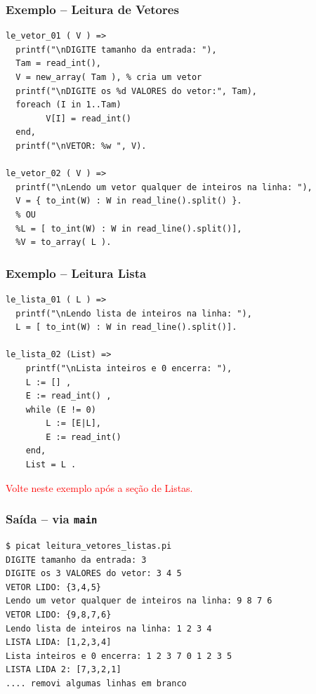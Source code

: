\begin{frame}[fragile]
\frametitle{Exemplo -- Leitura de Vetores}    

\begin{footnotesize}
\begin{verbatim}
le_vetor_01 ( V ) =>
  printf("\nDIGITE tamanho da entrada: "),
  Tam = read_int(),
  V = new_array( Tam ), % cria um vetor
  printf("\nDIGITE os %d VALORES do vetor:", Tam),
  foreach (I in 1..Tam)
        V[I] = read_int()
  end,
  printf("\nVETOR: %w ", V).
  
le_vetor_02 ( V ) =>  
  printf("\nLendo um vetor qualquer de inteiros na linha: "),
  V = { to_int(W) : W in read_line().split() }.
  % OU
  %L = [ to_int(W) : W in read_line().split()],
  %V = to_array( L ).
\end{verbatim}
\end{footnotesize}       
\end{frame}


\begin{frame}[fragile]
\frametitle{Exemplo -- Leitura Lista}    

\begin{footnotesize}
\begin{verbatim}
le_lista_01 ( L ) =>  
  printf("\nLendo lista de inteiros na linha: "),
  L = [ to_int(W) : W in read_line().split()].
  
le_lista_02 (List) =>  
    printf("\nLista inteiros e 0 encerra: "),
    L := [] ,
    E := read_int() ,
    while (E != 0)  
        L := [E|L],  
        E := read_int()  
    end,  
    List = L .
\end{verbatim}
\end{footnotesize}       
\textcolor{red}{Volte neste exemplo após a seção de Listas.}          
\end{frame}


\begin{frame}[fragile]
\frametitle{Saída -- via \texttt{main}}    

\begin{footnotesize}
\begin{verbatim}
$ picat leitura_vetores_listas.pi 
DIGITE tamanho da entrada: 3
DIGITE os 3 VALORES do vetor: 3 4 5
VETOR LIDO: {3,4,5} 
Lendo um vetor qualquer de inteiros na linha: 9 8 7 6 
VETOR LIDO: {9,8,7,6} 
Lendo lista de inteiros na linha: 1 2 3 4 
LISTA LIDA: [1,2,3,4] 
Lista inteiros e 0 encerra: 1 2 3 7 0 1 2 3 5
LISTA LIDA 2: [7,3,2,1] 
.... removi algumas linhas em branco
\end{verbatim}
\end{footnotesize}       
\end{frame}

